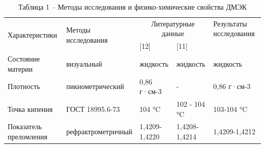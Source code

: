 \begin{table}[H]
\caption*{Таблица 1 -- Методы исследования и физико-химические свойства ДМЭК}
\centering
\begin{tabular}{|p{}|l|ll|p{}|}
\hline
\multirow{2}{*}{Характеристики} & \multirow{2}{*}{Методы исследования} & \multicolumn{2}{c|}{Литературные данные}           & Результаты исследования \\ \cline{3-5} 
                  &                  & \multicolumn{1}{l|}{{[}12{]}}    & {[}11{]}     &             \\ \hline
Состояние материи & визуальный       & \multicolumn{1}{l|}{жидкость}    & жидкость     & жидкость    \\ \hline
Плотность         & пикнометрический & \multicolumn{1}{l|}{0,86 г·см-3} & -            & 0,86 г·см-3 \\ \hline
Точка кипения     & ГОСТ 18995.6-73  & \multicolumn{1}{l|}{104 °C}      & 102 - 104 °C & 103-104 °C  \\ \hline
Показатель преломления          & рефрактрометричный                   & \multicolumn{1}{l|}{1,4209-1,4220} & 1,4208-1,4214 & 1,4209-1,4212           \\ \hline
\end{tabular}
\end{table}

